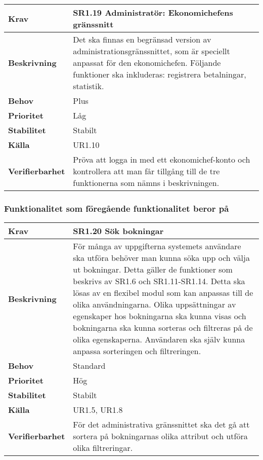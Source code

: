 \documentclass[a4paper, twoside, 11pt, titlepage]{article}
\begin{document}
			\begin {table} [ht] \begin{tabular} { p{2.6cm} p{12.5cm} }
				\hline
				\sffamily\textbf{Krav} & \sffamily\textbf{SR1.19 Administratör: Ekonomichefens gränssnitt } \\
				\hline
				\sffamily\textbf{Beskrivning} & Det ska finnas en begränsad version av administrationsgränssnittet, som är speciellt anpassat för den ekonomichefen. Följande funktioner ska inkluderas: registrera betalningar, statistik.  \\
				\hline
				\sffamily\textbf{Behov} & Plus  \\
				\hline
				\sffamily\textbf{Prioritet} & Låg  \\
				\hline
				\sffamily\textbf{Stabilitet} & Stabilt  \\
				\hline
				\sffamily\textbf{Källa} & UR1.10  \\
				\hline
				\sffamily\textbf{Verifierbarhet} & Pröva att logga in med ett ekonomichef-konto och kontrollera att man får tillgång till de tre funktionerna som nämns i beskrivningen.  \\
				\hline
			\end{tabular} \end{table} \FloatBarrier


		\subsubsection{Funktionalitet som föregående funktionalitet beror på}


		\begin {table} [ht] \begin{tabular} { p{2.6cm} p{12.5cm} }
			\hline
			\sffamily\textbf{Krav} & \sffamily\textbf{SR1.20 Sök bokningar } \\
			\hline
			\sffamily\textbf{Beskrivning} & För många av uppgifterna systemets användare ska utföra behöver man kunna söka upp och välja ut bokningar. Detta gäller de funktioner som beskrivs av SR1.6 och SR1.11-SR1.14. Detta ska lösas av en flexibel modul som kan anpassas till de olika användningarna. Olika uppsättningar av egenskaper hos bokningarna ska kunna visas och bokningarna ska kunna sorteras och filtreras på de olika egenskaperna. Användaren ska själv kunna anpassa sorteringen och filtreringen.  \\
			\hline
			\sffamily\textbf{Behov} & Standard  \\
			\hline
			\sffamily\textbf{Prioritet} & Hög  \\
			\hline
			\sffamily\textbf{Stabilitet} & Stabilt  \\
			\hline
			\sffamily\textbf{Källa} & UR1.5, UR1.8  \\
			\hline
			\sffamily\textbf{Verifierbarhet} &  För det administrativa gränssnittet ska det gå att sortera på bokningarnas olika attribut och utföra olika filtreringar.  \\
			\hline
		\end{tabular} \end{table} \FloatBarrier
		\vspace{6mm}
\end{document}
